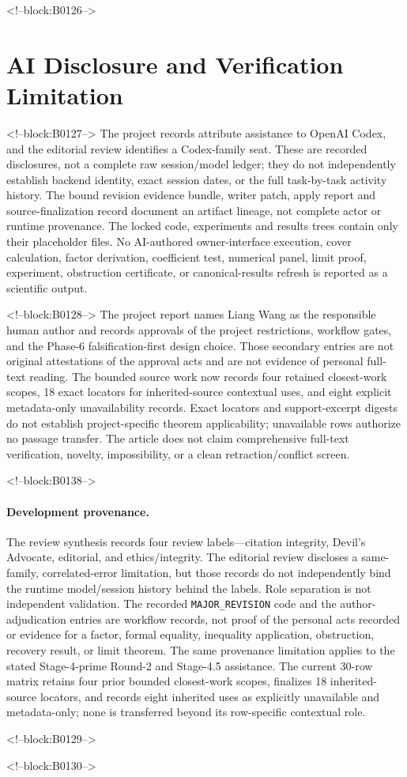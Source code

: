 \documentclass[11pt]{article}
\begin{document}
<!--block:B0126-->
\hypertarget{ai-disclosure-and-verification-limitation}{%
\section*{AI Disclosure and Verification
Limitation}\label{ai-disclosure-and-verification-limitation}}

<!--block:B0127-->
The project records attribute assistance to OpenAI Codex, and the editorial
review identifies a Codex-family seat. These are recorded disclosures, not a
complete raw session/model ledger; they do not independently establish backend
identity, exact session dates, or the full task-by-task activity history. The
bound revision evidence bundle, writer patch, apply report and source-finalization
record document an artifact lineage, not complete actor or runtime provenance.
The locked code, experiments and results trees contain only their placeholder
files. No AI-authored owner-interface execution, cover calculation, factor
derivation, coefficient test, numerical panel, limit proof, experiment, obstruction
certificate, or canonical-results refresh is reported as a scientific output.

<!--block:B0128-->
The project report names Liang Wang as the responsible human author and records
approvals of the project restrictions, workflow gates, and the Phase-6
falsification-first design choice. Those secondary entries are not original
attestations of the approval acts and are not evidence of personal full-text
reading.
The bounded source work now records four retained closest-work scopes, 18 exact
locators for inherited-source contextual uses, and eight explicit metadata-only
unavailability records. Exact locators and support-excerpt digests do not establish
project-specific theorem applicability; unavailable rows authorize no passage
transfer. The article does not claim comprehensive full-text verification, novelty,
impossibility, or a clean retraction/conflict screen.

<!--block:B0138-->
\begingroup\sloppy
\paragraph{Development provenance.} The review synthesis records four review
labels---citation integrity, Devil's Advocate, editorial, and ethics/integrity.
The editorial review discloses a same-family, correlated-error limitation, but
those records do not independently bind the runtime model/session history behind
the labels. Role separation is not independent validation. The recorded
\texttt{MAJOR\_REVISION} code and the author-adjudication entries are workflow
records, not proof of the personal acts recorded or evidence for a factor, formal
equality, inequality application, obstruction, recovery result, or limit theorem.
The same provenance limitation applies to the stated Stage-4-prime Round-2 and
Stage-4.5 assistance. The current 30-row
matrix retains four prior bounded closest-work scopes, finalizes 18 inherited-source
locators, and records eight inherited uses as explicitly unavailable and
metadata-only; none is transferred beyond its row-specific contextual role.
\par\endgroup

<!--block:B0129-->



<!--block:B0130-->
\end{document}
